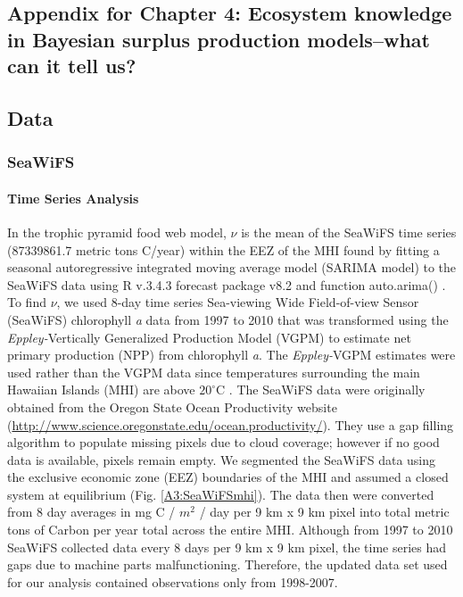 \documentclass[oneside,12pt,final]{sty/ucthesis-CA2012}
\let\cite\citep                             %
\begin{document}
\begin{mainmatter}
\chapter{Appendix for Chapter 4: Ecosystem knowledge in Bayesian surplus production models--what can it tell us?}{\label{appendix:c}}


\section{Data}
\subsection{SeaWiFS}
\subsubsection{Time Series Analysis}
In the trophic pyramid food web model, $\nu$ is the mean of the SeaWiFS time series (87339861.7 metric tons C/year) within the EEZ of the MHI found by fitting a seasonal autoregressive integrated moving average model (SARIMA model) to the SeaWiFS data using R v.3.4.3 \cite{Rcite} forecast package v8.2 and function auto.arima() \cite{forecast1, forecast2}. To find $\nu$, we used 8-day time series Sea-viewing Wide Field-of-view Sensor (SeaWiFS) chlorophyll \textit{a} data from 1997 to 2010 that was transformed using the \textit{Eppley-}Vertically Generalized Production Model (VGPM) to estimate net primary production (NPP) from chlorophyll \textit{a}. The \textit{Eppley-}VGPM estimates were used rather than the VGPM data since temperatures surrounding the main Hawaiian Islands (MHI) are above $20^{\circ}$C \cite{morel1991pigment, antoine1996oceanic, stock2017reconciling}. The SeaWiFS data were originally obtained from the Oregon State Ocean Productivity website (\url{http://www.science.oregonstate.edu/ocean.productivity/}). They use a gap filling algorithm to populate missing pixels due to cloud coverage; however if no good data is available, pixels remain empty. We segmented the SeaWiFS data using the exclusive economic zone (EEZ) boundaries of the MHI and assumed a closed system at equilibrium (Fig. \ref{A3:SeaWiFSmhi}). The data then were converted from 8 day averages in mg C / $m^2$ / day per 9 km x 9 km pixel into total metric tons of Carbon per year total across the entire MHI. Although from 1997 to 2010 SeaWiFS collected data every 8 days  per 9 km x 9 km pixel, the time series had gaps due to machine parts malfunctioning. Therefore, the updated data set used for our analysis contained observations only from 1998-2007. 


\end{mainmatter}
\end{document}
